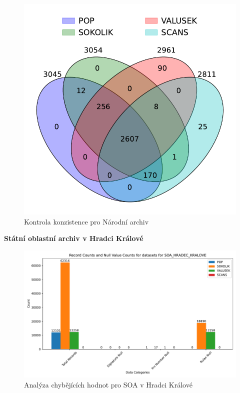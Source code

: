 \begin{figure}[htbp]
\centering
    \includegraphics[scale=.35]{obrazky-figures/dataAnalysis/hpPraha/Venn_4.pdf}
    \caption{Kontrola konzistence pro Národní archiv}
\end{figure}


\newpage
\noindent\textbf{Státní oblastní archiv v Hradci Králové}\\
\begin{figure}[htbp]
\centering
    \includegraphics[scale=.5]{obrazky-figures/dataAnalysis/soaHradecKralove/missingValues.pdf}
    \caption{Analýza chybějících hodnot pro SOA v Hradci Králové}
\end{figure}

